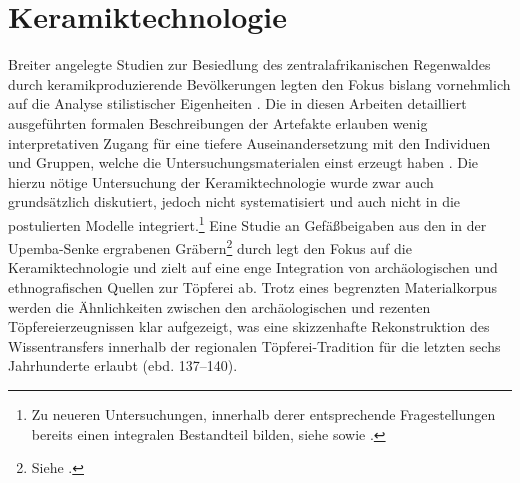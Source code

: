 \chapter[Keramiktechnologie]{Keramiktechnologie}\label{sec:Herstellung}

\begin{multicols}{2}
\raggedcolumns
\noindent Breiter angelegte Studien zur Besiedlung des zentralafrikanischen Regenwaldes durch keramikproduzierende Bevölkerungen legten den Fokus bislang vornehmlich auf die Analyse stilistischer Eigenheiten \parencites[siehe][]{Wotzka.1995}{MbidaMindzie.19951996}{AssokoNdong.20002001}{Clist.20042005}{GouemGouem.20102011}{NlendNlend.20132014}. Die in diesen Arbeiten detailliert ausgeführten formalen Beschreibungen der Artefakte erlauben wenig interpretativen Zugang für eine tiefere Auseinandersetzung mit den Individuen und Gruppen, welche die Untersuchungsmaterialen einst erzeugt haben \parencite[siehe][238\,f.]{vanderLeeuw.1993}. Die hierzu nötige Untersuchung der Keramiktechnologie wurde zwar auch grundsätzlich diskutiert, jedoch nicht systematisiert und auch nicht in die postulierten Modelle integriert.\footnote{Zu neueren Untersuchungen, innerhalb derer entsprechende Fragestellungen bereits einen integralen Bestandteil bilden, siehe \textcite{Riemer.2011} sowie \textcites{Mayor.2011}{Gallay.2012}{vanDoosselaere.2014}.} Eine Studie an Gefäßbeigaben aus den in der Upemba-Senke ergrabenen Gräbern\footnote{Siehe \textcites{deMaret.1977}{deMaret.1999a}{deMaret.2016}.} durch \textcite{LivingstoneSmith.2010c} legt den Fokus auf die Keramiktechnologie und zielt auf eine enge Integration von archäologischen und ethnografischen Quellen zur Töpferei ab. Trotz eines begrenzten Materialkorpus werden die Ähnlichkeiten zwischen den archäologischen und rezenten Töpfereierzeugnissen klar aufgezeigt, was eine skizzenhafte Rekonstruktion des Wissentransfers innerhalb der regionalen Töpferei-Tradition für die letzten sechs Jahrhunderte erlaubt (ebd. 137--140).


\end{multicols}

